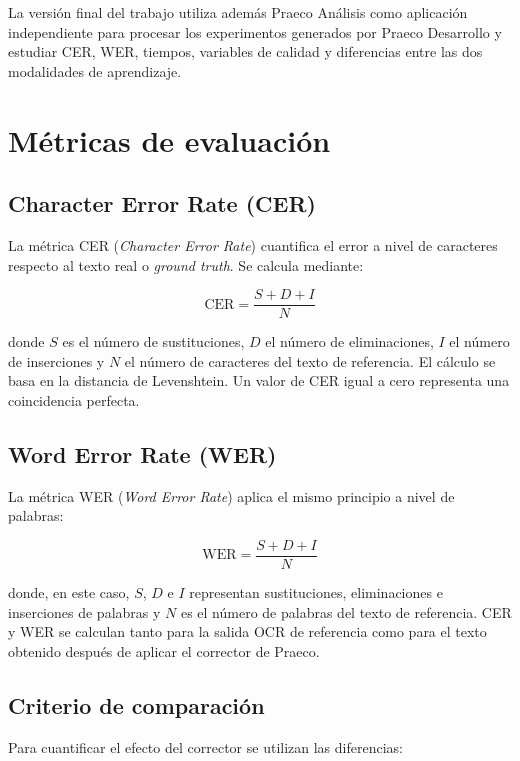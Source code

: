 La versión final del trabajo utiliza además Praeco Análisis como aplicación independiente para procesar los experimentos generados por Praeco Desarrollo y estudiar CER, WER, tiempos, variables de calidad y diferencias entre las dos modalidades de aprendizaje.

\section{Métricas de evaluación}

\subsection{Character Error Rate (CER)}
La métrica CER (\textit{Character Error Rate}) cuantifica el error a nivel de caracteres respecto al texto real o \textit{ground truth}. Se calcula mediante:

\begin{equation}
	\mathrm{CER}=\frac{S+D+I}{N}
\end{equation}

donde $S$ es el número de sustituciones, $D$ el número de eliminaciones, $I$ el número de inserciones y $N$ el número de caracteres del texto de referencia. El cálculo se basa en la distancia de Levenshtein. Un valor de CER igual a cero representa una coincidencia perfecta.

\subsection{Word Error Rate (WER)}
La métrica WER (\textit{Word Error Rate}) aplica el mismo principio a nivel de palabras:

\begin{equation}
	\mathrm{WER}=\frac{S+D+I}{N}
\end{equation}

donde, en este caso, $S$, $D$ e $I$ representan sustituciones, eliminaciones e inserciones de palabras y $N$ es el número de palabras del texto de referencia. CER y WER se calculan tanto para la salida OCR de referencia como para el texto obtenido después de aplicar el corrector de Praeco.

\subsection{Criterio de comparación}
Para cuantificar el efecto del corrector se utilizan las diferencias:

